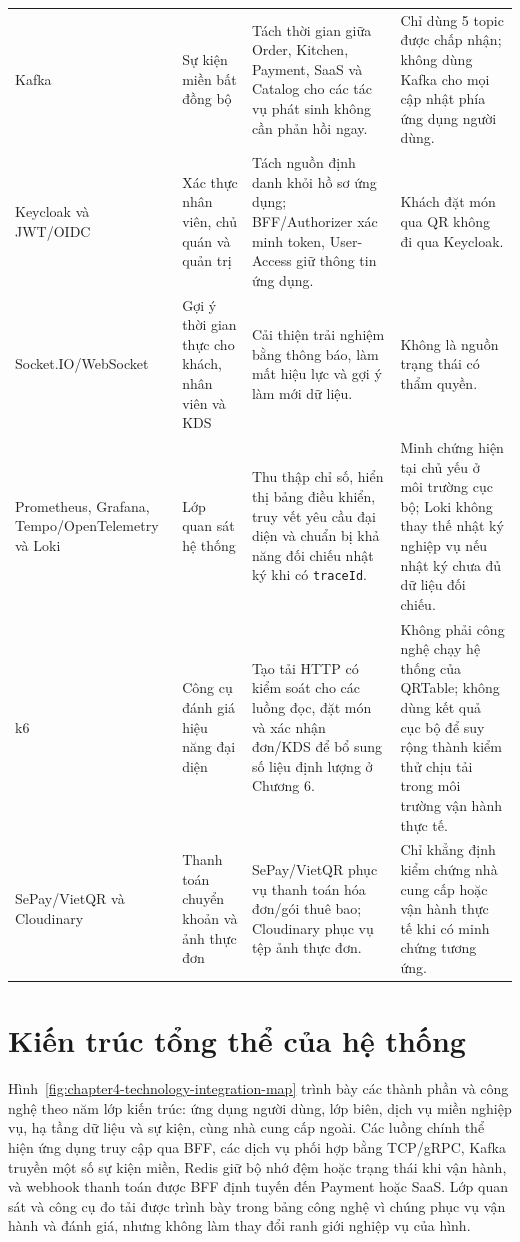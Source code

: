 {\begin{longtable}{>{\raggedright\arraybackslash}p{}>{\raggedright\arraybackslash}p{}>{\raggedright\arraybackslash}p{}>{\raggedright\arraybackslash}p{}}
  Kafka & Sự kiện miền bất đồng bộ & Tách thời gian giữa Order, Kitchen, Payment, SaaS và Catalog cho các tác vụ phát sinh không cần phản hồi ngay. & Chỉ dùng 5 topic được chấp nhận; không dùng Kafka cho mọi cập nhật phía ứng dụng người dùng. \\
  Keycloak và JWT/OIDC & Xác thực nhân viên, chủ quán và quản trị & Tách nguồn định danh khỏi hồ sơ ứng dụng; BFF/Authorizer xác minh token, User-Access giữ thông tin ứng dụng. & Khách đặt món qua QR không đi qua Keycloak. \\
  Socket.IO\slash WebSocket & Gợi ý thời gian thực cho khách, nhân viên và KDS & Cải thiện trải nghiệm bằng thông báo, làm mất hiệu lực và gợi ý làm mới dữ liệu. & Không là nguồn trạng thái có thẩm quyền. \\
  Prometheus, Grafana, Tempo\slash OpenTelemetry và Loki & Lớp quan sát hệ thống & Thu thập chỉ số, hiển thị bảng điều khiển, truy vết yêu cầu đại diện và chuẩn bị khả năng đối chiếu nhật ký khi có \texttt{traceId}. & Minh chứng hiện tại chủ yếu ở môi trường cục bộ; Loki không thay thế nhật ký nghiệp vụ nếu nhật ký chưa đủ dữ liệu đối chiếu. \\
  k6 & Công cụ đánh giá hiệu năng đại diện & Tạo tải HTTP có kiểm soát cho các luồng đọc, đặt món và xác nhận đơn/KDS để bổ sung số liệu định lượng ở Chương 6. & Không phải công nghệ chạy hệ thống của QRTable; không dùng kết quả cục bộ để suy rộng thành kiểm thử chịu tải trong môi trường vận hành thực tế. \\
  SePay\slash VietQR và Cloudinary & Thanh toán chuyển khoản và ảnh thực đơn & SePay\slash VietQR phục vụ thanh toán hóa đơn/gói thuê bao; Cloudinary phục vụ tệp ảnh thực đơn. & Chỉ khẳng định kiểm chứng nhà cung cấp hoặc vận hành thực tế khi có minh chứng tương ứng. \\
\end{longtable}
}

\section{Kiến trúc tổng thể của hệ thống}

Hình~\ref{fig:chapter4-technology-integration-map} trình bày các thành phần và công nghệ theo năm lớp kiến trúc: ứng dụng người dùng, lớp biên, dịch vụ miền nghiệp vụ, hạ tầng dữ liệu và sự kiện, cùng nhà cung cấp ngoài. Các luồng chính thể hiện ứng dụng truy cập qua BFF, các dịch vụ phối hợp bằng TCP/gRPC, Kafka truyền một số sự kiện miền, Redis giữ bộ nhớ đệm hoặc trạng thái khi vận hành, và webhook thanh toán được BFF định tuyến đến Payment hoặc SaaS. Lớp quan sát và công cụ đo tải được trình bày trong bảng công nghệ vì chúng phục vụ vận hành và đánh giá, nhưng không làm thay đổi ranh giới nghiệp vụ của hình.

